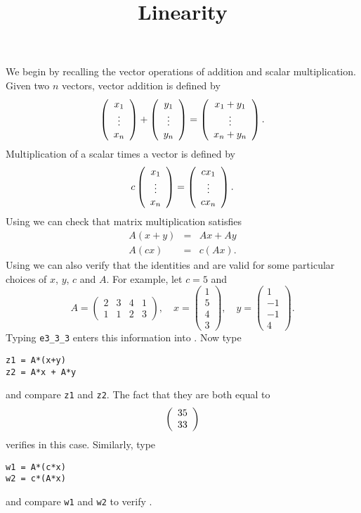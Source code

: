 \documentclass{ximera}
\title{Linearity}
\begin{document}
\begin{abstract}
\end{abstract}
\maketitle

  \label{S:linearity}

We begin by recalling the vector operations of addition and
scalar multiplication.  Given two $n$ vectors, vector addition
 is defined by
\[
\left(\begin{array}{c} x_1 \\ \vdots \\ x_{n}\end{array}\right)+\left(\begin{array}{c} y_1 \\ \vdots \\ y_{n}\end{array}\right)=\left(\begin{array}{c} x_1+y_1 \\ \vdots \\
x_n+y_n\end{array}\right).
\]
Multiplication of a scalar  times a vector
is defined by
\[
c\left(\begin{array}{c} x_1 \\ \vdots \\ x_{n}\end{array}\right) = \left(\begin{array}{c} cx_1 \\ \vdots \\ cx_{n}\end{array}\right).
\]
Using  we can check that matrix multiplication
satisfies
\begin{eqnarray}
A(x+y) & = & Ax + Ay \label{sum} \\
A(cx) & = & c(Ax). \label{product}
\end{eqnarray}
Using \Matlab we can also verify that the identities 
and  are valid for some particular choices of $x$,
$y$, $c$ and $A$.  For example, let $c=5$ and
\begin{equation*}
A = \left(\begin{array}{cccc} 2 & 3 & 4 & 1\\ 1 & 1 & 2 & 3
\end{array}\right), \quad x = \left(\begin{array}{r} 1 \\ 5 \\ 4 \\
3 \end{array}\right), \quad y = \left(\begin{array}{r} 1 \\ -1 \\ -1 \\
4 \end{array}\right).
\end{equation*}
Typing {\tt e3\_3\_3} enters this information into \Matlabp.  Now
type
\begin{verbatim}
z1 = A*(x+y)
z2 = A*x + A*y
\end{verbatim}
and compare {\tt z1} and {\tt z2}.  The fact that they are both
equal to
\[
\left(\begin{array}{r} 35 \\ 33\end{array}\right)
\]
verifies  in this case.  Similarly, type
\begin{verbatim}
w1 = A*(c*x)
w2 = c*(A*x)
\end{verbatim}
and compare {\tt w1} and {\tt w2} to verify .
\end{document}

